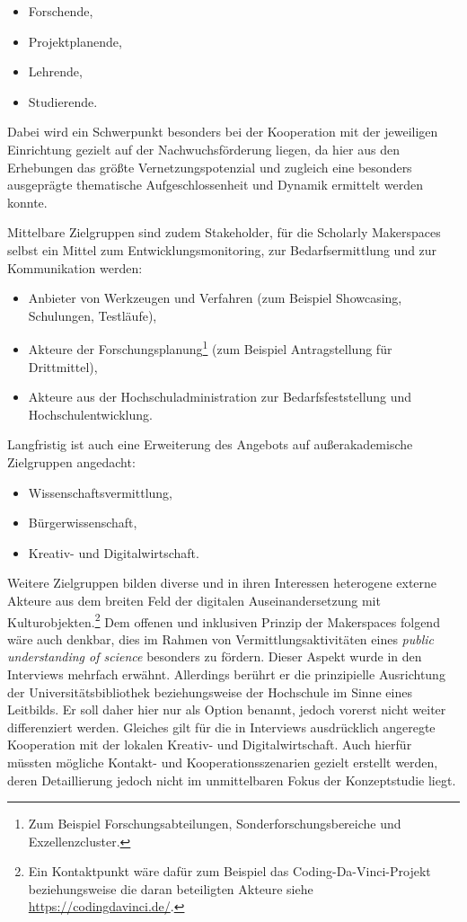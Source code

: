 \documentclass[a4paper,
fontsize=11pt,
oneside,
numbers=noperiodatend,
parskip=half-,
bibliography=totoc,
final
]{scrartcl}
\begin{document}
\pagebreak
\begin{itemize}
\item Forschende,
\item Projektplanende,
\item Lehrende,
\item Studierende.
\end{itemize}

Dabei wird ein Schwerpunkt besonders bei der Kooperation mit der
jeweiligen Einrichtung gezielt auf der Nachwuchsförderung liegen, da
hier aus den Erhebungen das größte Vernetzungspotenzial und zugleich
eine besonders ausgeprägte thematische Aufgeschlossenheit und Dynamik
ermittelt werden konnte.

Mittelbare Zielgruppen sind zudem Stakeholder, für die Scholarly
Makerspaces selbst ein Mittel zum Entwicklungsmonitoring, zur
Bedarfsermittlung und zur Kommunikation werden:

\begin{itemize}

\item
  Anbieter von Werkzeugen und Verfahren (zum Beispiel Showcasing,
  Schulungen, Testläufe),
\item
  Akteure der Forschungsplanung\footnote{Zum Beispiel
    Forschungsabteilungen, Sonderforschungsbereiche und
    Exzellenzcluster.} (zum Beispiel Antragstellung für Drittmittel),
\item
  Akteure aus der Hochschuladministration zur Bedarfsfeststellung und
  Hochschulentwicklung.
\end{itemize}

Langfristig ist auch eine Erweiterung des Angebots auf außerakademische
Zielgruppen angedacht:

\begin{itemize}

\item
  Wissenschaftsvermittlung,
\item
  Bürgerwissenschaft,
\item
  Kreativ- und Digitalwirtschaft.
\end{itemize}

Weitere Zielgruppen bilden diverse und in ihren Interessen heterogene
externe Akteure aus dem breiten Feld der digitalen Auseinandersetzung
mit Kulturobjekten.\footnote{Ein Kontaktpunkt wäre dafür zum Beispiel
  das Coding-Da-Vinci-Projekt beziehungsweise die daran beteiligten
  Akteure siehe \url{https://codingdavinci.de/}.} Dem offenen und
inklusiven Prinzip der Makerspaces folgend wäre auch denkbar, dies im
Rahmen von Vermittlungsaktivitäten eines \emph{public understanding of
science} besonders zu fördern. Dieser Aspekt wurde in den Interviews
mehrfach erwähnt. Allerdings berührt er die prinzipielle Ausrichtung der
Universitätsbibliothek beziehungsweise der Hochschule im Sinne eines
Leitbilds. Er soll daher hier nur als Option benannt, jedoch vorerst
nicht weiter differenziert werden. Gleiches gilt für die in Interviews
ausdrücklich angeregte Kooperation mit der lokalen Kreativ- und
Digitalwirtschaft. Auch hierfür müssten mögliche Kontakt- und
Kooperationsszenarien gezielt erstellt werden, deren Detaillierung
jedoch nicht im unmittelbaren Fokus der Konzeptstudie liegt.
\end{document}
